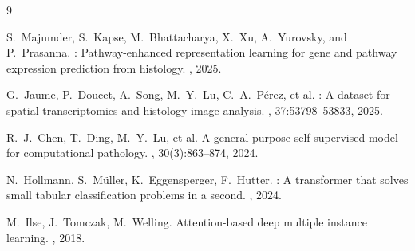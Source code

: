 \documentclass[10pt,twocolumn,letterpaper]{article}
\begin{document}

\begin{thebibliography}{9}

S.~Majumder, S.~Kapse, M.~Bhattacharya, X.~Xu, A.~Yurovsky, and P.~Prasanna.
: Pathway-enhanced representation learning for gene and pathway expression prediction from histology.
, 2025.

G.~Jaume, P.~Doucet, A.~Song, M.~Y.~Lu, C.~A.~Pérez, et al.
: A dataset for spatial transcriptomics and histology image analysis.
, 37:53798--53833, 2025.

R.~J.~Chen, T.~Ding, M.~Y.~Lu, et al.
\newblock A general-purpose self-supervised model for computational pathology.
, 30(3):863--874, 2024.

N.~Hollmann, S.~Müller, K.~Eggensperger, F.~Hutter.
: A transformer that solves small tabular classification problems in a second.
, 2024.

M.~Ilse, J.~Tomczak, M.~Welling.
\newblock Attention-based deep multiple instance learning.
, 2018.

\end{thebibliography}
\end{document}
